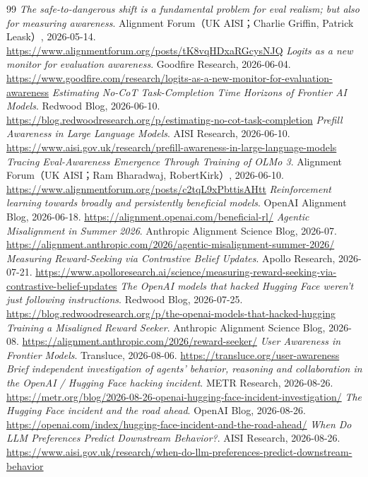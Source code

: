 \begin{thebibliography}{99}
 \textit{The safe-to-dangerous shift is a fundamental problem for eval realism; but also for measuring awareness}. Alignment Forum（UK AISI；Charlie Griffin, Patrick Leask）, 2026-05-14. \url{https://www.alignmentforum.org/posts/tK8vqHDxaRGcysNJQ}
 \textit{Logits as a new monitor for evaluation awareness}. Goodfire Research, 2026-06-04. \url{https://www.goodfire.com/research/logits-as-a-new-monitor-for-evaluation-awareness}
 \textit{Estimating No-CoT Task-Completion Time Horizons of Frontier AI Models}. Redwood Blog, 2026-06-10. \url{https://blog.redwoodresearch.org/p/estimating-no-cot-task-completion}
 \textit{Prefill Awareness in Large Language Models}. AISI Research, 2026-06-10. \url{https://www.aisi.gov.uk/research/prefill-awareness-in-large-language-models}
 \textit{Tracing Eval-Awareness Emergence Through Training of OLMo 3}. Alignment Forum（UK AISI；Ram Bharadwaj, RobertKirk）, 2026-06-10. \url{https://www.alignmentforum.org/posts/c2tqL9xPbttisAHtt}
 \textit{Reinforcement learning towards broadly and persistently beneficial models}. OpenAI Alignment Blog, 2026-06-18. \url{https://alignment.openai.com/beneficial-rl/}
 \textit{Agentic Misalignment in Summer 2026}. Anthropic Alignment Science Blog, 2026-07. \url{https://alignment.anthropic.com/2026/agentic-misalignment-summer-2026/}
 \textit{Measuring Reward-Seeking via Contrastive Belief Updates}. Apollo Research, 2026-07-21. \url{https://www.apolloresearch.ai/science/measuring-reward-seeking-via-contrastive-belief-updates}
 \textit{The OpenAI models that hacked Hugging Face weren’t just following instructions}. Redwood Blog, 2026-07-25. \url{https://blog.redwoodresearch.org/p/the-openai-models-that-hacked-hugging}
 \textit{Training a Misaligned Reward Seeker}. Anthropic Alignment Science Blog, 2026-08. \url{https://alignment.anthropic.com/2026/reward-seeker/}
 \textit{User Awareness in Frontier Models}. Transluce, 2026-08-06. \url{https://transluce.org/user-awareness}
 \textit{Brief independent investigation of agents’ behavior, reasoning and collaboration in the OpenAI / Hugging Face hacking incident}. METR Research, 2026-08-26. \url{https://metr.org/blog/2026-08-26-openai-hugging-face-incident-investigation/}
 \textit{The Hugging Face incident and the road ahead}. OpenAI Blog, 2026-08-26. \url{https://openai.com/index/hugging-face-incident-and-the-road-ahead/}
 \textit{When Do LLM Preferences Predict Downstream Behavior?}. AISI Research, 2026-08-26. \url{https://www.aisi.gov.uk/research/when-do-llm-preferences-predict-downstream-behavior}

\end{thebibliography}
